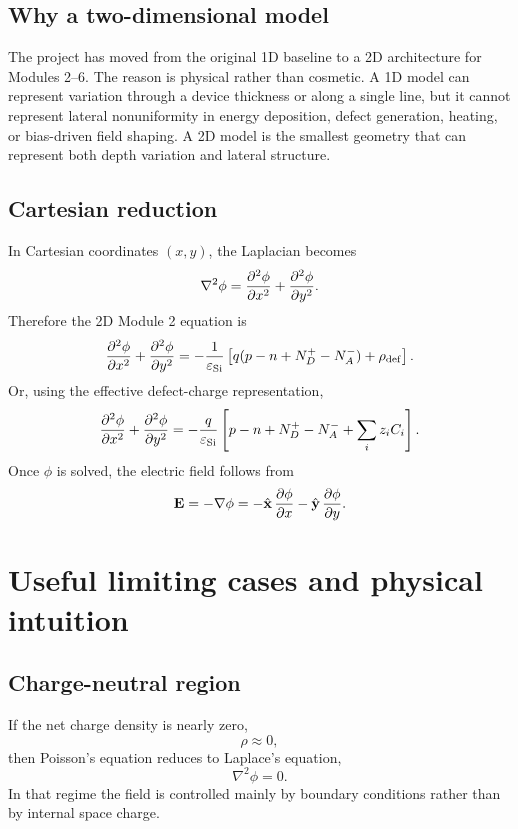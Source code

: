 \documentclass[11pt]{article}
\newcommand{\Evec}{\mathbf{E}}
\begin{document}
\subsection{Why a two-dimensional model}

The project has moved from the original 1D baseline to a 2D architecture for Modules 2--6. The reason is physical rather than cosmetic. A 1D model can represent variation through a device thickness or along a single line, but it cannot represent lateral nonuniformity in energy deposition, defect generation, heating, or bias-driven field shaping. A 2D model is the smallest geometry that can represent both depth variation and lateral structure.

\subsection{Cartesian reduction}

In Cartesian coordinates $(x,y)$, the Laplacian becomes
\begin{equation}
\nabla^2 \phi = \pdv[2]{\phi}{x} + \pdv[2]{\phi}{y}.
\end{equation}
Therefore the 2D Module 2 equation is
\begin{equation}
\pdv[2]{\phi}{x} + \pdv[2]{\phi}{y}
= -\frac{1}{\varepsilon_{\mathrm{Si}}}
\left[q(p - n + N_D^+ - N_A^-) + \rho_{\mathrm{def}}\right].
\end{equation}
Or, using the effective defect-charge representation,
\begin{equation}
\pdv[2]{\phi}{x} + \pdv[2]{\phi}{y}
= -\frac{q}{\varepsilon_{\mathrm{Si}}}
\left[p - n + N_D^+ - N_A^- + \sum_i z_i C_i\right].
\end{equation}
Once $\phi$ is solved, the electric field follows from
\begin{equation}
\Evec = -\nabla \phi
= -\hat{\mathbf{x}}\,\pdv{\phi}{x} - \hat{\mathbf{y}}\,\pdv{\phi}{y}.
\end{equation}

\section{Useful limiting cases and physical intuition}

\subsection{Charge-neutral region}

If the net charge density is nearly zero,
\begin{equation}
\rho \approx 0,
\end{equation}
then Poisson's equation reduces to Laplace's equation,
\begin{equation}
\nabla^2 \phi = 0.
\end{equation}
In that regime the field is controlled mainly by boundary conditions rather than by internal space charge.
\end{document}
